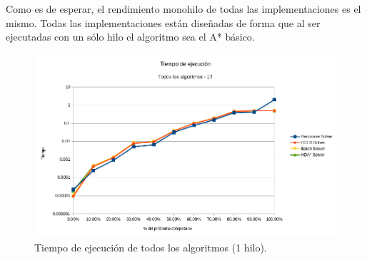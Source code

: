 Como es de esperar, el rendimiento monohilo de todas
las implementaciones es el mismo.
Todas las implementaciones están diseñadas de forma
que al ser ejecutadas con un sólo hilo
el algoritmo sea el A* básico.

\begin{figure}[h]
    \begin{center}
        \includegraphics[width=\textwidth]{Media/Ch2/Runtime_All_Algorithms_1.png}
    \end{center}
    \caption{Tiempo de ejecución de todos los algoritmos (1 hilo).}
    \label{fig:MetricasSinglethread}
\end{figure}

